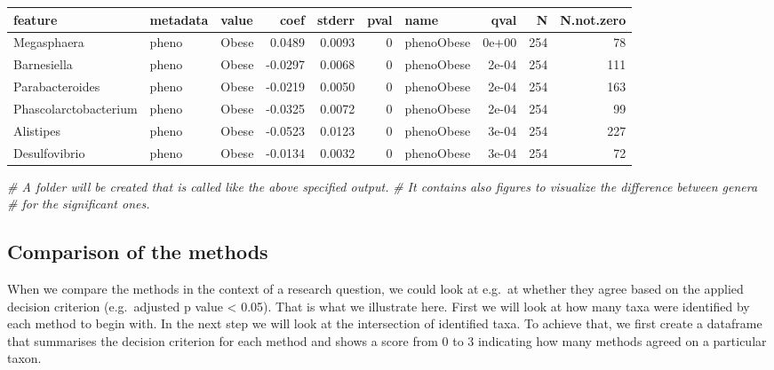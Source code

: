 \documentclass[
]{book}
\newenvironment{Shaded}{\begin{snugshade}}{\end{snugshade}}
\newcommand{\CommentTok}[1]{\textcolor[rgb]{0.56,0.35,0.01}{\textit{#1}}}
\newcommand{\FloatTok}[1]{\textcolor[rgb]{0.00,0.00,0.81}{#1}}
\newcommand{\FunctionTok}[1]{\textcolor[rgb]{0.00,0.00,0.00}{#1}}
\newcommand{\NormalTok}[1]{#1}
\newcommand{\SpecialCharTok}[1]{\textcolor[rgb]{0.00,0.00,0.00}{#1}}
\begin{document}
\begin{Shaded}
\end{Shaded}

\begin{tabular}{l|l|l|r|r|r|l|r|r|r}
\hline
feature & metadata & value & coef & stderr & pval & name & qval & N & N.not.zero\\
\hline
Megasphaera & pheno & Obese & 0.0489 & 0.0093 & 0 & phenoObese & 0e+00 & 254 & 78\\
\hline
Barnesiella & pheno & Obese & -0.0297 & 0.0068 & 0 & phenoObese & 2e-04 & 254 & 111\\
\hline
Parabacteroides & pheno & Obese & -0.0219 & 0.0050 & 0 & phenoObese & 2e-04 & 254 & 163\\
\hline
Phascolarctobacterium & pheno & Obese & -0.0325 & 0.0072 & 0 & phenoObese & 2e-04 & 254 & 99\\
\hline
Alistipes & pheno & Obese & -0.0523 & 0.0123 & 0 & phenoObese & 3e-04 & 254 & 227\\
\hline
Desulfovibrio & pheno & Obese & -0.0134 & 0.0032 & 0 & phenoObese & 3e-04 & 254 & 72\\
\hline
\end{tabular}

\begin{Shaded}
\begin{Highlighting}[]
\CommentTok{\# A folder will be created that is called like the above specified output.}
\CommentTok{\# It contains also figures to visualize the difference between genera }
\CommentTok{\# for the significant ones.}
\end{Highlighting}
\end{Shaded}

\hypertarget{comparison-of-the-methods}{%
\subsection{Comparison of the methods}\label{comparison-of-the-methods}}

When we compare the methods in the context of a research question, we could
look at e.g.~at whether they agree based on the applied decision criterion
(e.g.~adjusted p value \textless{} 0.05). That is what we illustrate here. First we will
look at how many taxa were identified by each method to begin with. In the next
step we will look at the intersection of identified taxa. To achieve that, we
first create a dataframe that summarises the decision criterion for each method
and shows a score from 0 to 3 indicating how many methods agreed on a particular
taxon.
\end{document}
